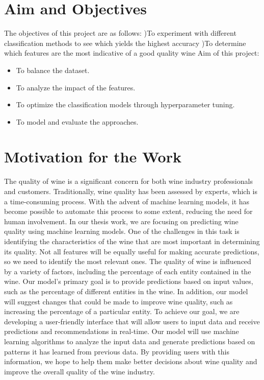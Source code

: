 \documentclass[a4paper, 12pt]{report}
\begin{document}
\section{Aim and Objectives  }
\par The objectives of this project are as follows:
)To experiment with different classification methods to see which yields the highest accuracy
)To determine which features are the most indicative of a good quality wine
\newline
\newline
Aim of this project:
\begin{itemize}
  \item To balance the dataset. 
  \item To analyze the impact of the features. 
  \item To optimize the classification models through hyperparameter tuning.  
  \item To model and evaluate the approaches.

 
\end{itemize}

\section{Motivation for the Work }
\par The quality of wine is a significant concern for both wine industry professionals and customers. Traditionally, wine quality has been assessed by experts, which is a time-consuming process. With the advent of machine learning models, it has become possible to automate this process to some extent, reducing the need for human involvement.
In our thesis work, we are focusing on predicting wine quality using machine learning models. One of the challenges in this task is identifying the characteristics of the wine that are most important in determining its quality. Not all features will be equally useful for making accurate predictions, so we need to identify the most relevant ones.
The quality of wine is influenced by a variety of factors, including the percentage of each entity contained in the wine. Our model's primary goal is to provide predictions based on input values, such as the percentage of different entities in the wine. In addition, our model will suggest changes that could be made to improve wine quality, such as increasing the percentage of a particular entity.
To achieve our goal, we are developing a user-friendly interface that will allow users to input data and receive predictions and recommendations in real-time. Our model will use machine learning algorithms to analyze the input data and generate predictions based on patterns it has learned from previous data. By providing users with this information, we hope to help them make better decisions about wine quality and improve the overall quality of the wine industry.
\end{document}
